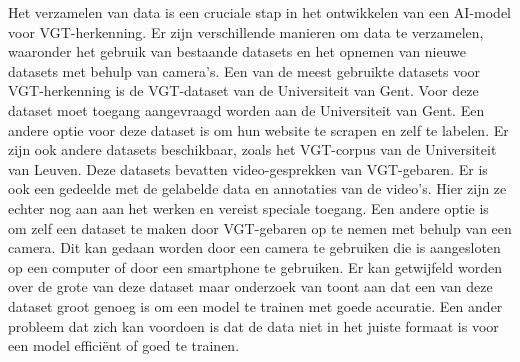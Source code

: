 Het verzamelen van data is een cruciale stap in het ontwikkelen van een AI-model voor VGT-herkenning.
Er zijn verschillende manieren om data te verzamelen, waaronder het gebruik van bestaande datasets en het opnemen van nieuwe datasets met behulp van camera's.
Een van de meest gebruikte datasets voor VGT-herkenning is de VGT-dataset van de Universiteit van Gent\autocite{VGT_Signbank}.
Voor deze dataset moet toegang aangevraagd worden aan de Universiteit van Gent.
Een andere optie voor deze dataset is om hun website te scrapen en zelf te labelen.
Er zijn ook andere datasets beschikbaar, zoals het VGT-corpus van de Universiteit van Leuven\textcite{Corpus_VGT}.
Deze datasets bevatten video-gesprekken van VGT-gebaren.
Er is ook een gedeelde met de gelabelde data en annotaties van de video's.
Hier zijn ze echter nog aan aan het werken en vereist speciale toegang\autocite{Over_het_Corpus_VGT}.
Een andere optie is om zelf een dataset te maken door VGT-gebaren op te nemen met behulp van een camera.
Dit kan gedaan worden door een camera te gebruiken die is aangesloten op een computer of door een smartphone te gebruiken.
Er kan getwijfeld worden over de grote van deze dataset maar onderzoek van \textcite{Coster2023} toont aan dat een van deze dataset groot genoeg is om een model te trainen met goede accuratie.
Een ander probleem dat zich kan voordoen is dat de data niet in het juiste formaat is voor een model effici{\"e}nt of goed te trainen\autocite{Vandeghinste2024}.



